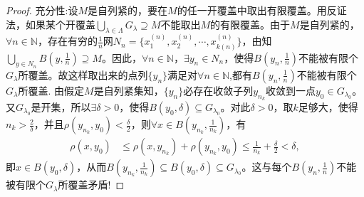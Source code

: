 \documentclass[../../main.tex]{subfiles}%
\begin{document}
\begin{proof}
{\heiti 充分性:}设$M$是自列紧的，要在$M$的任一开覆盖中取出有限覆盖。用反证法，如果某个开覆盖$\bigcup\limits_{\lambda\in\Lambda}G_\lambda\supseteq M$不能取出$M$的有限覆盖。由于$M$是自列紧的，$\forall n\in\mathbb{N}$，存在有穷的$\frac{1}{n}$网$N_n=\{x_1^{(n)},x_2^{(n)},\cdots,x_{k(n)}^{(n)}\}$，由知$\bigcup\limits_{y\in N_n}B(y,\frac{1}{n})\supseteq M$。因此，$\forall n\in\mathbb{N}$，$\exists y_n\in N_n$，使得$B(y_n,\frac{1}{n})$不能被有限个$G_\lambda$所覆盖。故这样取出来的点列$\{y_n\}$满足对$\forall n\in\mathbb{N}$,都有$B(y_n,\frac{1}{n})$不能被有限个$G_\lambda$所覆盖.
由假定$M$是自列紧集知，$\{y_n\}$必存在收敛子列$y_{n_k}$收敛到一点$y_0\in G_{\lambda_0}$。又$G_{\lambda_0}$是开集，所以$\exists\delta>0$，使得$B(y_0,\delta)\subseteq G_{\lambda_0}$。对此$\delta>0$，取$k$足够大，使得$n_k>\frac{2}{\delta}$，并且$\rho(y_{n_k},y_0)<\frac{\delta}{2}$，则$\forall x\in B(y_{n_k},\frac{1}{n_k})$，有
\begin{align*}
\rho(x,y_0)&\leqslant\rho(x,y_{n_k})+\rho(y_{n_k},y_0)\leqslant\frac{1}{n_k}+\frac{\delta}{2}<\delta,
\end{align*}
即$x\in B(y_0,\delta)$，从而$B(y_{n_k},\frac{1}{n_k})\subseteq B(y_0,\delta)\subseteq G_{\lambda_0}$。这与每个$B(y_n,\frac{1}{n})$不能被有限个$G_\lambda$所覆盖矛盾!

\end{proof}
\end{document}
